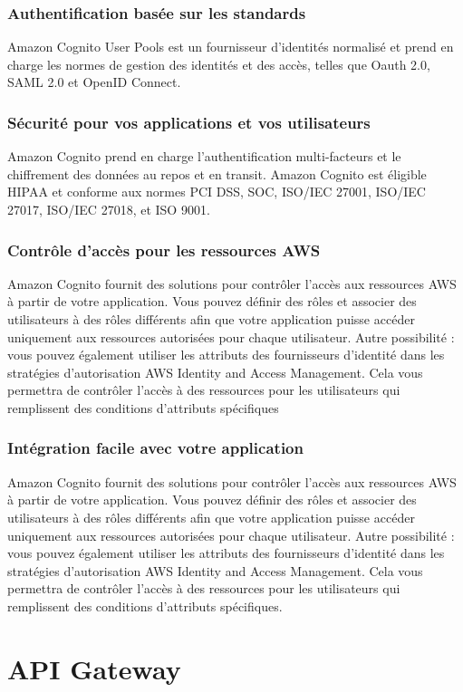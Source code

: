 \subsubsection{Authentification basée sur les standards}
Amazon Cognito User Pools est un fournisseur d’identités normalisé et prend en charge les normes de
gestion des identités et des accès, telles que Oauth 2.0, SAML 2.0 et OpenID Connect.
\subsubsection{Sécurité pour vos applications et vos utilisateurs}
Amazon Cognito prend en charge l’authentification multi-facteurs et le chiffrement des données au repos et
en transit. Amazon Cognito est éligible HIPAA et conforme aux normes PCI DSS, SOC, ISO/IEC 27001,
ISO/IEC 27017, ISO/IEC 27018, et ISO 9001.
\subsubsection{Contrôle d’accès pour les ressources AWS}
Amazon Cognito fournit des solutions pour contrôler l’accès aux ressources AWS à partir de votre application. Vous pouvez définir des rôles et associer des utilisateurs à des rôles différents afin que votre
application puisse accéder uniquement aux ressources autorisées pour chaque utilisateur. Autre possibilité
: vous pouvez également utiliser les attributs des fournisseurs d’identité dans les stratégies d’autorisation
AWS Identity and Access Management. Cela vous permettra de contrôler l’accès à des ressources pour les
utilisateurs qui remplissent des conditions d’attributs spécifiques
\subsubsection{Intégration facile avec votre application}
Amazon Cognito fournit des solutions pour contrôler l’accès aux ressources AWS à partir de votre application. Vous pouvez définir des rôles et associer des utilisateurs à des rôles différents afin que votre
application puisse accéder uniquement aux ressources autorisées pour chaque utilisateur. Autre possibilité
: vous pouvez également utiliser les attributs des fournisseurs d’identité dans les stratégies d’autorisation
AWS Identity and Access Management. Cela vous permettra de contrôler l’accès à des ressources pour les
utilisateurs qui remplissent des conditions d’attributs spécifiques.


\section{API Gateway}

